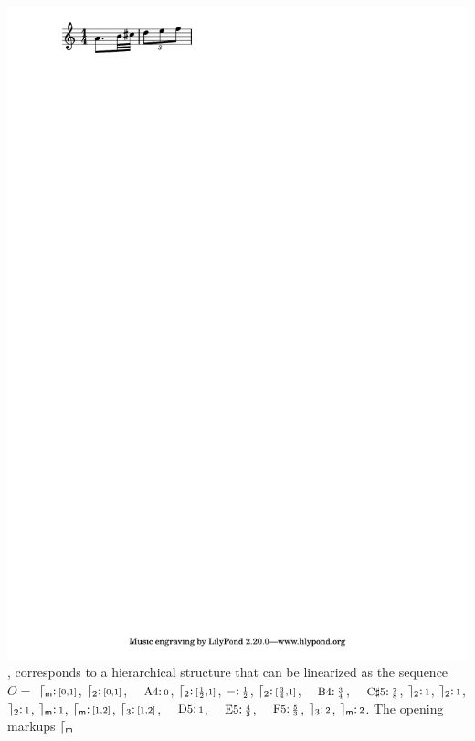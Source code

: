 \begin{example}
\includegraphics[scale=0.35,trim=0 5mm 0 0]{pictures/ex1.pdf},
corresponds to a hierarchical structure
that can be linearized as the sequence
$O =$
$\lceil_{\mathsf{m}}\mathpunct{:}{\scriptstyle [0,1]}$,
$\lceil_{2}\mathpunct{:}{\scriptstyle [0,1]}$,
$\mbox{\footnotesize A4}\tstamp{0}$,
$\lceil_{2}\mathpunct{:}{\scriptstyle [\frac{1}{2},1]}$,
$-\mathpunct{:}{\scriptstyle \frac{1}{2}}$,
$\lceil_{2}\mathpunct{:}{\scriptstyle [\frac{3}{4},1]}$,
$\mbox{\footnotesize B4}\tstamp{\frac{3}{4}}$,
$\mbox{\footnotesize C$\sharp$5}\tstamp{\frac{7}{8}}$,
$\rceil_{2}\mathpunct{:}{\scriptstyle 1}$,
$\rceil_{2}\mathpunct{:}{\scriptstyle 1}$,
$\rceil_{2}\mathpunct{:}{\scriptstyle 1}$,
$\rceil_{\mathsf{m}}\mathpunct{:}{\scriptstyle 1}$,
$\lceil_{\mathsf{m}}\mathpunct{:}{\scriptstyle [1,2]}$,
$\lceil_{3}\mathpunct{:}{\scriptstyle [1,2]}$,
$\mbox{\footnotesize D5}\tstamp{1}$,
$\mbox{\footnotesize E5}\tstamp{\frac{4}{3}}$,
$\mbox{\footnotesize F5}\tstamp{\frac{5}{3}}$,
$\rceil_{3}\mathpunct{:}{\scriptstyle 2}$,
$\rceil_{\mathsf{m}}\mathpunct{:}{\scriptstyle 2}$.
The opening markups $\lceil_{\mathsf{m}}$ %

\end{example}
